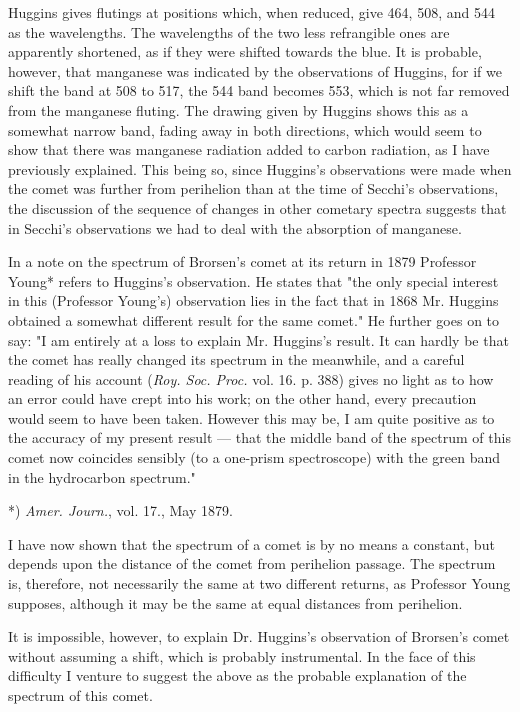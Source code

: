 \documentclass[a4paper, 12pt, oneside, polutonikogreek, english]{article}
\begin{document}
Huggins gives flutings at positions which, when reduced, give 464, 508, and 544 as the wavelengths. The wavelengths of the two less refrangible ones are apparently shortened, as if they were shifted towards the blue. It is probable, however, that manganese was indicated by the observations of Huggins, for if we shift the band at 508 to 517, the 544 band becomes 553, which is not far removed from the manganese fluting. The drawing given by Huggins shows this as a somewhat narrow band, fading away in both directions, which would seem to show that there was manganese radiation added to carbon radiation, as I have previously explained. This being so, since Huggins's observations were made when the comet was further from perihelion than at the time of Secchi's observations, the discussion of the sequence of changes in other cometary spectra suggests that in Secchi's observations we had to deal with the absorption of manganese.

In a note on the spectrum of Brorsen's comet at its return in 1879 Professor Young* refers to Huggins's observation. He states that "the only special interest in this (Professor Young's) observation lies in the fact that in 1868 Mr. Huggins obtained a somewhat different result for the same comet." He further goes on to say: "I am entirely at a loss to explain Mr. Huggins's result. It can hardly be that the comet has really changed its spectrum in the meanwhile, and a careful reading of his account (\emph{Roy. Soc. Proc.} vol. 16. p. 388) gives no light as to how an error could have crept into his work; on the other hand, every precaution would seem to have been taken. However this may be, I am quite positive as to the accuracy of my present result --- that the middle band of the spectrum of this comet now coincides sensibly (to a one-prism spectroscope) with the green band in the hydrocarbon spectrum."

*) \emph{Amer. Journ.}, vol. 17., May 1879.

I have now shown that the spectrum of a comet is by no means a constant, but depends upon the distance of the comet from perihelion passage. The spectrum is, therefore, not necessarily the same at two different returns, as Professor Young supposes, although it may be the same at equal distances from perihelion.

It is impossible, however, to explain Dr. Huggins's observation of Brorsen's comet without assuming a shift, which is probably instrumental. In the face of this difficulty I venture to suggest the above as the probable explanation of the spectrum of this comet.
\end{document}
